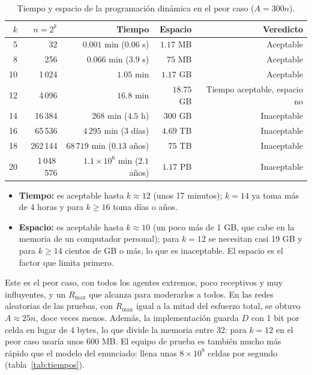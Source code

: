 \documentclass[11pt,letterpaper]{article}
\newcommand{\Rmax}{R_{\max}}
\begin{document}
\begin{table}[h]
\centering
\begin{tabular}{rrrrr}
\toprule
$k$ & $n = 2^k$ & Tiempo & Espacio & Veredicto \\
\midrule
5  & 32        & $0.001$ min ($0.06$ s)        & $1.17$ MB  & Aceptable \\
8  & 256       & $0.066$ min ($3.9$ s)         & $75$ MB    & Aceptable \\
10 & 1\,024    & $1.05$ min                    & $1.17$ GB  & Aceptable \\
12 & 4\,096    & $16.8$ min                    & $18.75$ GB & Tiempo aceptable, espacio no \\
14 & 16\,384   & $268$ min ($4.5$ h)           & $300$ GB   & Inaceptable \\
16 & 65\,536   & $4\,295$ min ($3$ días)       & $4.69$ TB  & Inaceptable \\
18 & 262\,144  & $68\,719$ min ($0.13$ años)   & $75$ TB    & Inaceptable \\
20 & 1\,048\,576 & $1.1\times 10^6$ min ($2.1$ años) & $1.17$ PB & Inaceptable \\
\bottomrule
\end{tabular}
\caption{Tiempo y espacio de la programación dinámica en el peor caso ($A = 300n$).}
\label{tab:pd-practica}
\end{table}

\begin{itemize}
  \item \textbf{Tiempo:} es aceptable hasta $k \approx 12$ (unos 17 minutos);
        $k = 14$ ya toma más de 4 horas y para $k \ge 16$ toma días o años.
  \item \textbf{Espacio:} es aceptable hasta $k \approx 10$ (un poco más de
        1 GB, que cabe en la memoria de un computador personal); para
        $k = 12$ se necesitan casi 19 GB y para $k \ge 14$ cientos de GB o
        más, lo que es inaceptable. El espacio es el factor que limita
        primero.
\end{itemize}

Este es el peor caso, con todos los agentes extremos, poco receptivos y muy
influyentes, y un $\Rmax$ que alcanza para moderarlos a todos. En las redes
aleatorias de las pruebas, con $\Rmax$ igual a la mitad del esfuerzo total,
se obtuvo $A \approx 25n$, doce veces menos. Además, la implementación guarda
$D$ con 1 bit por celda en lugar de 4 bytes, lo que divide la memoria entre
32: para $k = 12$ en el peor caso usaría unos $600$ MB. El equipo de prueba
es también mucho más rápido que el modelo del enunciado: llena unas
$8\times 10^8$ celdas por segundo (tabla~\ref{tab:tiempos}).
\end{document}
